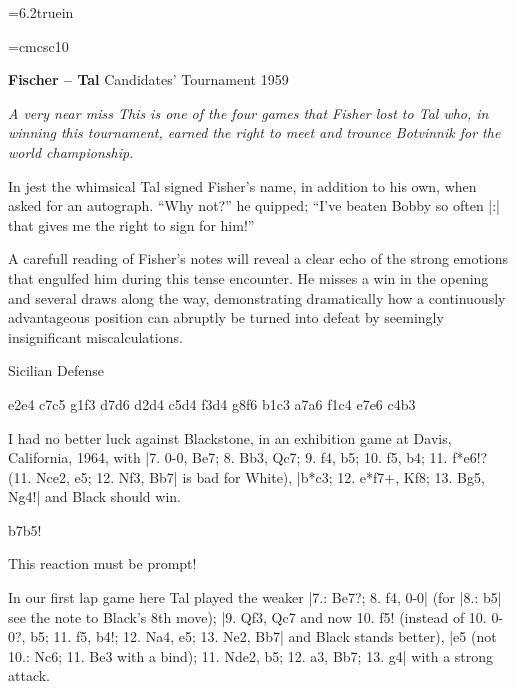 


\hsize=6.2truein
\parindent=0pt
\overfullrule=0pt

\gutter{20pt}
\font\sc=cmcsc10

{\bf Fischer -- Tal}\smallskip
Candidates' Tournament 1959\medskip
{\sl A very near miss\smallskip
This is one of the four games that Fisher lost to Tal who, in winning
this tournament, earned the right to meet and trounce Botvinnik for the
world championship.

In jest the whimsical Tal signed Fisher's name, in addition to his own,
when asked for an autograph. ``Why not?'' he quipped; ``I've beaten
Bobby so often |:| that gives me the right to sign for him!''

A carefull reading of Fisher's notes will reveal a clear echo of the
strong emotions that engulfed him during this tense encounter. He misses
a win in the opening and several draws along the way, demonstrating
dramatically how a continuously advantageous position can abruptly be
turned into defeat by seemingly insignificant miscalculations.}

{\sc Sicilian Defense}\medskip

\newgame
\move e2e4 c7c5
\move g1f3 d7d6
\move d2d4 c5d4
\move f3d4 g8f6
\move b1c3 a7a6
\move f1c4 e7e6
\ply  c4b3

I had no better luck against Blackstone, in an exhibition game at Davis,
California, 1964, with |7. 0-0, Be7; 8. Bb3, Qc7; 9. f4, b5; 10. f5, b4;
11. f*e6!? (11. Nce2, e5; 12. Nf3, Bb7| is bad for White), |b*c3; 12. e*f7+, 
Kf8; 13. Bg5, Ng4!| and Black should win.

\ply       b7b5!

This reaction must be prompt! 

In our first lap game here Tal played the weaker |7.: Be7?; 8. f4, 0-0|
(for |8.: b5| see the note to Black's 8th move); |9. Qf3, Qc7 and now
10. f5! (instead of 10. 0-0?, b5; 11. f5, b4!; 12. Na4, e5; 13. Ne2,
Bb7| and Black stands better), |e5 (not 10.: Nc6; 11. Be3 with a bind);
11. Nde2, b5; 12. a3, Bb7; 13. g4| with a strong attack.

